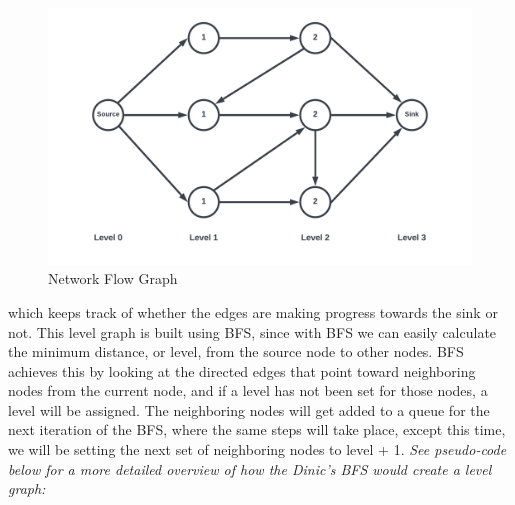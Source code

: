     \begin{figure}[H]
        \centering
        \includegraphics[scale=0.13, center]{figures/NetworkFlow_Dinics-4.png}
        \caption{Network Flow Graph}
    \end{figure}
    
    which keeps track of whether the edges are making progress towards the sink or not. This level graph is built using BFS, since with BFS we can easily calculate the minimum distance, or level, from the source node to other nodes. BFS achieves this by looking at the directed edges that point toward neighboring nodes from the current node, and if a level has not been set for those nodes, a level will be assigned. The neighboring nodes will get added to a queue for the next iteration of the BFS, where the same steps will take place, except this time, we will be setting the next set of neighboring nodes to level + 1. \cite{williamfiset} \emph{See pseudo-code below for a more detailed overview of how the Dinic's BFS would create a level graph:}
    
